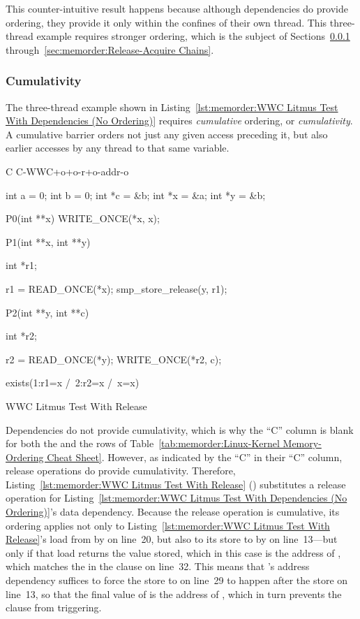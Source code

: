 This counter-intuitive result happens because although dependencies
do provide ordering, they provide it only within the confines of their
own thread.
This three-thread example requires stronger ordering, which
is the subject of
Sections~\ref{sec:memorder:Cumulativity}
through~\ref{sec:memorder:Release-Acquire Chains}.

\subsubsection{Cumulativity}
\label{sec:memorder:Cumulativity}

The three-thread example shown in
Listing~\ref{lst:memorder:WWC Litmus Test With Dependencies (No Ordering)}
requires \emph{cumulative} ordering, or \emph{cumulativity}.
A cumulative barrier orders not just any given access preceding it, but
also earlier accesses by any thread to that same variable.

\begin{listing}[tbp]
{ \scriptsize
\begin{verbbox}[\LstLineNo]
C C-WWC+o+o-r+o-addr-o

{
int a = 0;
int b = 0;
int *c = &b;
int *x = &a;
int *y = &b;
}

P0(int **x)
{
  WRITE_ONCE(*x, x);
}

P1(int **x, int **y)
{
  int *r1;

  r1 = READ_ONCE(*x);
  smp_store_release(y, r1);
}

P2(int **y, int **c)
{
  int *r2;

  r2 = READ_ONCE(*y);
  WRITE_ONCE(*r2, c);
}

exists(1:r1=x /\ 2:r2=x /\ x=x)
\end{verbbox}
}
\centering
\theverbbox
\caption{WWC Litmus Test With Release}
\label{lst:memorder:WWC Litmus Test With Release}
\end{listing}

Dependencies do not provide cumulativity,
which is why the ``C'' column is blank for
both the  and the  rows
of Table~\ref{tab:memorder:Linux-Kernel Memory-Ordering Cheat Sheet}.
However, as indicated by the ``C'' in their ``C'' column,
release operations do provide cumulativity.
Therefore,
Listing~\ref{lst:memorder:WWC Litmus Test With Release}
()
substitutes a release operation for
Listing~\ref{lst:memorder:WWC Litmus Test With Dependencies (No Ordering)}'s
data dependency.
Because the release operation is cumulative, its ordering applies not only to
Listing~\ref{lst:memorder:WWC Litmus Test With Release}'s
load from  by  on line~20, but also to its store to 
by  on line~13---but only if that load returns the value stored,
which in this case is the address of , which matches the 
in the  clause on line~32.
This means that 's address dependency suffices to force the
store to  on line~29 to happen after the store on line~13, so
that the final value of  is the address of , which
in turn prevents the  clause from triggering.

